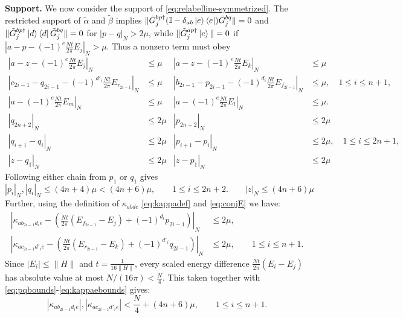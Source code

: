 \documentclass[aps,floatfix,10pt,amssymb,amsfont,amsmath,superscriptaddress,float,nofootinbib,longbibliography,nobalancelastpage,twocolumn]{revtex4-2}
\begin{document}
\textbf{Support.} We now consider the support of \eqref{eq:relabelline-symmetrized}. The restricted support of $\tilde\alpha$ and $\tilde\beta$ implies
$\|\tilde G^{bp\dagger}_{j}(\mathbb{I} - \delta_{ab}\ket{e}\bra{e})\tilde G^{bq}_{j}\| = 0$ and
$\|\tilde G^{bp\dagger}_{j}\ket{d}\bra{d}\tilde G^{bq}_{j}\| = 0$
for $|p-q|_{N} > 2\mu$, while
$\|\tilde G^{ap \dagger}_j \ket{e}\| = 0$ if
$|a-p-(-1)^e\frac{Nt}{2\pi}E_j|_{N}>\mu$.  Thus a nonzero
term must obey
\begin{equation}
\begin{aligned}
    |a-z-(-1)^e\tfrac{Nt}{2\pi}E_j|_{N} &\leq \mu
    &|a-z-(-1)^e\tfrac{Nt}{2\pi}E_k|_{N} &\leq \mu\\
    |c_{2i-1}-q_{2i-1}-(-1)^{d'_i}\tfrac{Nt}{2\pi}E_{r_{2i-1}}|_{N} &\leq \mu
    &|b_{2i-1}-p_{2i-1}-(-1)^{d_i}\tfrac{Nt}{2\pi}E_{f_{2i-1}}|_{N} &\leq \mu,
    \quad 1\leq i\leq n+1,\\
    |a-(-1)^{e}\tfrac{Nt}{2\pi}E_m|_{N} &\leq \mu
    &|a-(-1)^{e}\tfrac{Nt}{2\pi}E_l|_{N}& \leq \mu.\\
        |q_{2n+2}|_{N} &\leq 2\mu & |p_{2n+2}|_{N} &\leq 2\mu\\
    |q_{i+1}-q_i|_{N} &\leq 2\mu
    &|p_{i+1}-p_i|_{N} &\leq 2\mu,\quad 1\leq i\leq2n+1,\\
    |z-q_1|_{N} &\leq 2\mu & |z-p_1|_{N} &\leq 2\mu
\end{aligned}
\label{eq:conjE}
\end{equation}
Following either chain from $p_1$ or $q_1$ gives
\begin{equation}
    |p_i|_{N},|q_i|_{N} \leq (4n+4)\mu < (4n+6)\mu,
    \qquad 1\leq i\leq 2n+2. \qquad |z|_{N} \leq (4n+6)\mu
    \label{eq:pqbounds}
\end{equation}
Further, using the definition of $\kappa_{abde}$ \eqref{eq:kappadef} and \eqref{eq:conjE} we have:
\begin{align}
    \left|\kappa_{ab_{2i-1}d_i e}-\left(\tfrac{Nt}{2\pi}(E_{f_{2i-1}}-E_j)+(-1)^{d_i}p_{2i-1}\right)\right|_{N}&\leq 2\mu,\\
    \left|\kappa_{ac_{2i-1}d'_i e}-\left(\tfrac{Nt}{2\pi}(E_{r_{2i-1}}-E_k)+(-1)^{d'_i}q_{2i-1}\right)\right|_{N}&\leq 2\mu,
    \qquad 1\leq i\leq n+1.
    \label{eq:kappaebounds}
\end{align}
Since $|E_i|\leq\|H\|$ and $t=\frac{1}{16\|H\|}$, every scaled energy difference $\frac{Nt}{2\pi}(E_i - E_j)$ has absolute value at most $N/(16\pi)<\frac{N}{4}$. This taken together with \eqref{eq:pqbounds}-\eqref{eq:kappaebounds} gives:
\begin{equation}
    |\kappa_{ab_{2i-1}d_i e}|,|\kappa_{ac_{2i-1}d'_i e}| < \frac{N}{4}+(4n+6)\mu,
    \qquad 1\leq i\leq n+1.
    \label{eq:Qkappabound}
\end{equation}
\end{document}
